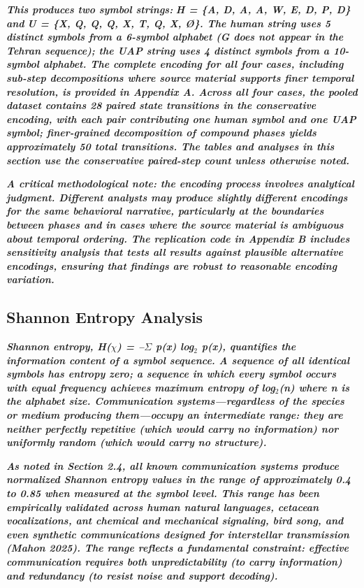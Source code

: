 \documentclass[11pt,letterpaper]{article}
\begin{document}
\textbf{\textit{This produces two symbol strings: }}\textbf{\textit{H = \{A, D, A, A, W, E, D, P, D\}}}\textbf{\textit{ and }}\textbf{\textit{U = \{X, Q, Q, Q, X, T, Q, X, {\O}\}}}\textbf{\textit{. The human string uses 5 distinct symbols from a 6-symbol alphabet (G does not appear in the Tehran sequence); the UAP string uses 4 distinct symbols from a 10-symbol alphabet. The complete encoding for all four cases, including sub-step decompositions where source material supports finer temporal resolution, is provided in Appendix A. Across all four cases, the pooled dataset contains 28 paired state transitions in the conservative encoding, with each pair contributing one human symbol and one UAP symbol; finer-grained decomposition of compound phases yields approximately 50 total transitions. The tables and analyses in this section use the conservative paired-step count unless otherwise noted.}}


\textbf{\textit{A critical methodological note: the encoding process involves analytical judgment. Different analysts may produce slightly different encodings for the same behavioral narrative, particularly at the boundaries between phases and in cases where the source material is ambiguous about temporal ordering. The replication code in Appendix B includes sensitivity analysis that tests all results against plausible alternative encodings, ensuring that findings are robust to reasonable encoding variation.}}


\subsection{Shannon Entropy Analysis}

\textbf{\textit{Shannon entropy, H($\chi$) = --$\Sigma$ p(x) log$_2$ p(x), quantifies the information content of a symbol sequence. A sequence of all identical symbols has entropy zero; a sequence in which every symbol occurs with equal frequency achieves maximum entropy of log$_2$(n) where n is the alphabet size. Communication systems---regardless of the species or medium producing them---occupy an intermediate range: they are neither perfectly repetitive (which would carry no information) nor uniformly random (which would carry no structure).}}


\textbf{\textit{As noted in Section 2.4, all known communication systems produce normalized Shannon entropy values in the range of approximately 0.4 to 0.85 when measured at the symbol level. This range has been empirically validated across human natural languages, cetacean vocalizations, ant chemical and mechanical signaling, bird song, and even synthetic communications designed for interstellar transmission (Mahon 2025). The range reflects a fundamental constraint: effective communication requires both unpredictability (to carry information) and redundancy (to resist noise and support decoding).}}
\end{document}
